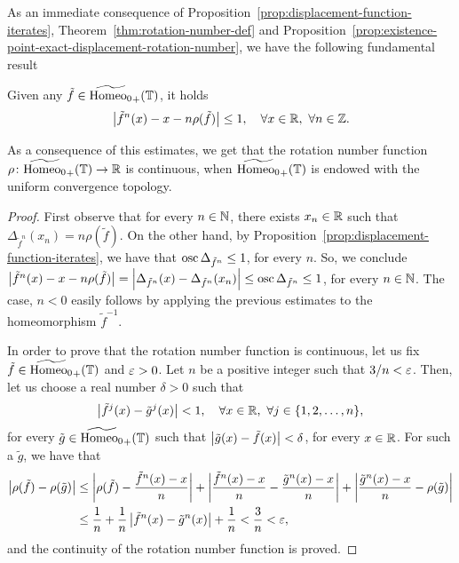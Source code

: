As an immediate consequence of Proposition~\ref{prop:displacement-function-iterates}, Theorem~\ref{thm:rotation-number-def} and Proposition~\ref{prop:existence-point-exact-displacement-rotation-number}, we have the following fundamental result

\begin{corollary}
  \label{cor:bounded-rotational-deviations-and-continuity-rotation-number}
  Given any $\tilde f\in\widetilde{\mathrm{Homeo}_0}_+(\mathbb{T})$, it holds
  \begin{displaymath}
    \left\lvert{\tilde f^n(x)-x-n\rho(\tilde f)}\right\rvert\leq 1, \quad\forall x\in\mathbb{R},\ \forall n\in\mathbb{Z}.
  \end{displaymath}

  As a consequence of this estimates, we get that the rotation number function $\rho\colon\widetilde{\mathrm{Homeo}_0}_+(\mathbb{T})\to\mathbb{R}$ is continuous, when $\widetilde{\mathrm{Homeo}_0}_+(\mathbb{T})$ is endowed with the uniform convergence topology.
\end{corollary}

\begin{proof}
  First observe that for every $n\in\mathbb{N}$, there exists $x_n\in\mathbb{R}$ such that $\Delta_{\tilde f^n}(x_n)=n\rho(\tilde f)$. On the other hand, by Proposition~\ref{prop:displacement-function-iterates}, we have that $\operatorname{osc}\Delta_{\tilde f^n}\leq 1$, for every $n$. So, we conclude $\left\lvert{\tilde f^n(x)-x-n\rho(\tilde f)}\right\rvert=\left\lvert{\Delta_{\tilde f^n}(x)-\Delta_{\tilde f^n}(x_n)}\right\rvert\leq\operatorname{osc}\Delta_{\tilde f^n}\leq 1$, for every $n\in\mathbb{N}$. The case, $n<0$ easily follows by applying the previous estimates to the homeomorphism $\tilde f^{-1}$.

  In order to prove that the rotation number function is continuous, let us fix $\tilde f\in\widetilde{\mathrm{Homeo}_0}_+(\mathbb{T})$ and $\varepsilon>0$. Let $n$ be a positive integer such that $3/n<\varepsilon$. Then, let us choose a real number $\delta>0$ such that
  \begin{displaymath}
    \left\lvert{\tilde f^j(x)-\tilde g^j(x)}\right\rvert<1, \quad\forall x\in\mathbb{R},\ \forall j\in\{1,2,\ldots,n\},
  \end{displaymath}
  for every $\tilde g\in\widetilde{\mathrm{Homeo}_0}_+(\mathbb{T})$ such that $\left\lvert{\tilde g(x)-\tilde f(x)}\right\rvert<\delta$, for every $x\in\mathbb{R}$. For such a $\tilde g$, we have that
  \begin{displaymath}
    \begin{split}
      \left\lvert{\rho(\tilde f)-\rho(\tilde g)}\right\rvert&\leq \left\lvert{\rho(\tilde f)-\frac{\tilde f^n(x)-x}{n}}\right\rvert + \left\lvert{\frac{\tilde f^n(x)-x}{n}-\frac{\tilde g^n(x)-x}{n}}\right\rvert + \left\lvert{\frac{\tilde g^n(x)-x}{n}-\rho(\tilde g)}\right\rvert \\
                                         &\leq \frac{1}{n} + \frac{1}{n}\left\lvert{\tilde f^n(x)-\tilde g^n(x)}\right\rvert + \frac{1}{n} < \frac{3}{n} < \varepsilon,
    \end{split}
  \end{displaymath}
  and the continuity of the rotation number function is proved.
\end{proof}


